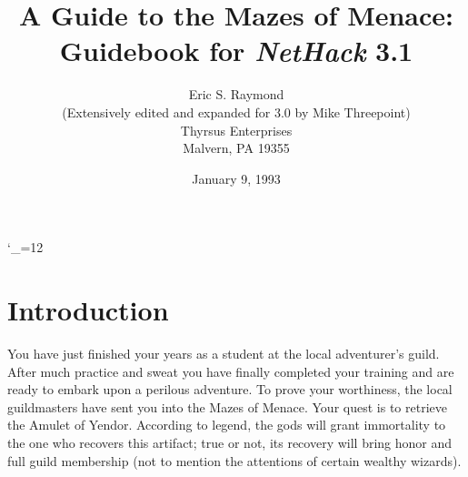 
\textheight 215mm
\textwidth 160mm
\oddsidemargin 0mm
\evensidemargin 0mm
\topmargin 0mm

\newcommand{\nd}{\noindent}

\newcommand{\tb}[1]{\tt #1 \hfill}
\newcommand{\bb}[1]{\bf #1 \hfill}
\newcommand{\ib}[1]{\it #1 \hfill}

\newcommand{\blist}[1]
{\begin{list}{$\bullet$}
    {\leftmargin 30mm \topsep 2mm \partopsep 0mm \parsep 0mm \itemsep 1mm
     \labelwidth 28mm \labelsep 2mm
     #1}}

\newcommand{\elist}{\end{list}}

\catcode`\_=12


%
%

\title{\LARGE A Guide to the Mazes of Menace:\\
\Large Guidebook for {\it NetHack\/} 3.1}

\author{Eric S. Raymond\\
(Extensively edited and expanded for 3.0 by Mike Threepoint)\\
Thyrsus Enterprises\\
Malvern, PA 19355
}
\date{January 9, 1993}

\maketitle

\section{Introduction}

You have just finished your years as a student at the local adventurer's
guild.  After much practice and sweat you have finally completed your
training and are ready to embark upon a perilous adventure.  To prove
your worthiness, the local guildmasters have sent you into the Mazes of
Menace.  Your quest is to retrieve the Amulet of Yendor.  According
to legend, the gods will grant immortality to the one who recovers this
artifact; true or not, its recovery will bring honor and full guild
membership (not to mention the attentions of certain wealthy wizards).

